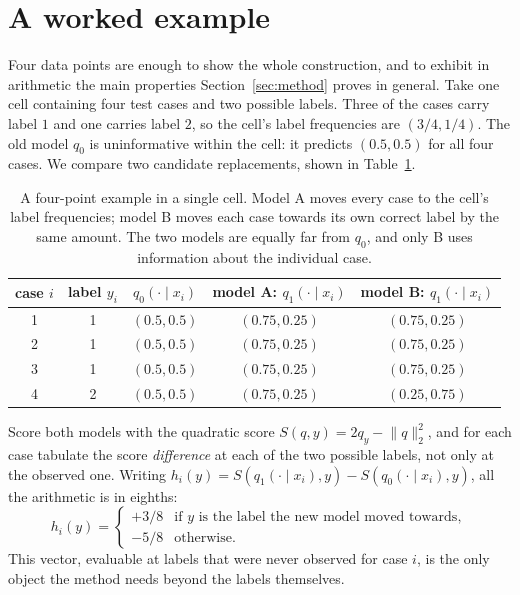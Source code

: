 
\section{A worked example}\label{app:worked}

Four data points are enough to show the whole construction, and to exhibit in arithmetic
the main properties Section~\ref{sec:method} proves in general. Take one cell containing
four test cases and two possible labels. Three of the cases carry label $1$ and one
carries label $2$, so the cell's label frequencies are $(3/4,1/4)$. The old model $q_0$
is uninformative within the cell: it predicts $(0.5,0.5)$ for all four cases. We compare
two candidate replacements, shown in Table~\ref{tab:worked}.

\begin{table}[t]
\centering
\small
\caption{A four-point example in a single cell. Model A moves every case to the cell's
label frequencies; model B moves each case towards its own correct label by the same
amount. The two models are equally far from $q_0$, and only B uses information about the
individual case.}
\label{tab:worked}
\begin{tabular}{@{}ccccc@{}}
\toprule
case $i$ & label $y_i$ & $q_0(\cdot\mid x_i)$ & model A: $q_1(\cdot\mid x_i)$ &
model B: $q_1(\cdot\mid x_i)$ \\
\midrule
1 & 1 & $(0.5,0.5)$ & $(0.75,0.25)$ & $(0.75,0.25)$ \\
2 & 1 & $(0.5,0.5)$ & $(0.75,0.25)$ & $(0.75,0.25)$ \\
3 & 1 & $(0.5,0.5)$ & $(0.75,0.25)$ & $(0.75,0.25)$ \\
4 & 2 & $(0.5,0.5)$ & $(0.75,0.25)$ & $(0.25,0.75)$ \\
\bottomrule
\end{tabular}
\end{table}

Score both models with the quadratic score $S(q,y)=2q_y-\lVert q\rVert_2^2$, and for each
case tabulate the score \emph{difference} at each of the two possible labels, not only at
the observed one. Writing $h_i(y)=S(q_1(\cdot\mid x_i),y)-S(q_0(\cdot\mid x_i),y)$, all
the arithmetic is in eighths:
\begin{equation}
h_i(y)=
\begin{cases}
+3/8 & \text{if $y$ is the label the new model moved towards},\\
-5/8 & \text{otherwise}.
\end{cases}
\label{eq:worked-h}
\end{equation}
This vector, evaluable at labels that were never observed for case $i$, is the only object
the method needs beyond the labels themselves.

